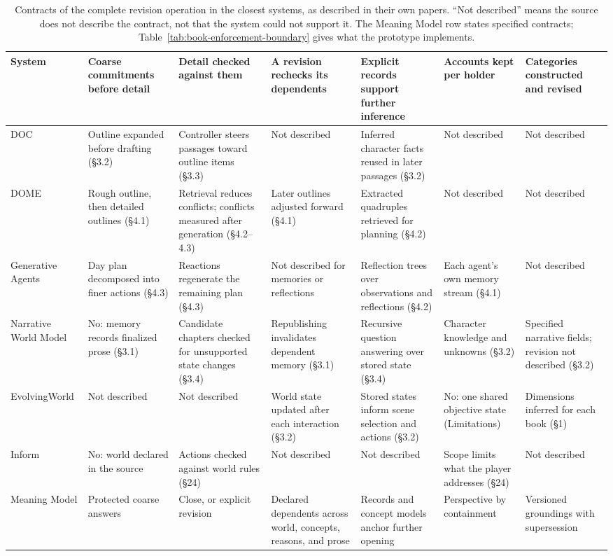 \documentclass[11pt,a4paper]{article}
\begin{document}
\begin{table}[htbp]
\centering
\scriptsize
\begin{tabularx}{\textwidth}{@{}>{\raggedright\arraybackslash}p{}YYYYYY@{}}
\toprule
System & Coarse commitments before detail & Detail checked against them & A revision rechecks its dependents & Explicit records support further inference & Accounts kept per holder & Categories constructed and revised \\
\midrule
DOC \cite{yang2023doc} & Outline expanded before drafting (\S3.2) & Controller steers passages toward outline items (\S3.3) & Not described & Inferred character facts reused in later passages (\S3.2) & Not described & Not described \\
DOME \cite{wang2024dome} & Rough outline, then detailed outlines (\S4.1) & Retrieval reduces conflicts; conflicts measured after generation (\S4.2--4.3) & Later outlines adjusted forward (\S4.1) & Extracted quadruples retrieved for planning (\S4.2) & Not described & Not described \\
Generative Agents \cite{park2023agents} & Day plan decomposed into finer actions (\S4.3) & Reactions regenerate the remaining plan (\S4.3) & Not described for memories or reflections & Reflection trees over observations and reflections (\S4.2) & Each agent's own memory stream (\S4.1) & Not described \\
Narrative World Model \cite{saifullah2026narrativeworld} & No: memory records finalized prose (\S3.1) & Candidate chapters checked for unsupported state changes (\S3.4) & Republishing invalidates dependent memory (\S3.1) & Recursive question answering over stored state (\S3.4) & Character knowledge and unknowns (\S3.2) & Specified narrative fields; revision not described (\S3.2) \\
EvolvingWorld \cite{zong2026evolvingworld} & Not described & Not described & World state updated after each interaction (\S3.2) & Stored states inform scene selection and actions (\S3.2) & No: one shared objective state (Limitations) & Dimensions inferred for each book (\S1) \\
Inform \cite{nelson2001inform} & No: world declared in the source & Actions checked against world rules (\S24) & Not described & Not described & Scope limits what the player addresses (\S24) & Not described \\
Meaning Model & Protected coarse answers & Close, or explicit revision & Declared dependents across world, concepts, reasons, and prose & Records and concept models anchor further opening & Perspective by containment & Versioned groundings with supersession \\
\bottomrule
\end{tabularx}
\caption{Contracts of the complete revision operation in the closest systems,
as described in their own papers. ``Not described'' means the source does not
describe the contract, not that the system could not support it. The Meaning
Model row states specified contracts;
Table~\ref{tab:book-enforcement-boundary} gives what the prototype
implements.}
\label{tab:predecessor-contracts}
\end{table}
\end{document}
